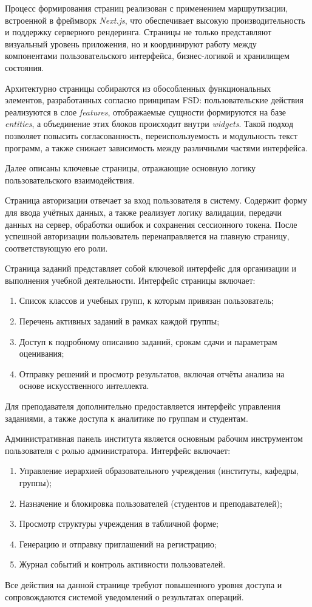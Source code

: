Процесс формирования страниц реализован с применением маршрутизации, встроенной в фреймворк \textit{Next.js}, что обеспечивает высокую производительность и поддержку серверного рендеринга. Страницы не только представляют визуальный уровень приложения, но и координируют работу между компонентами пользовательского интерфейса, бизнес-логикой и хранилищем состояния.

Архитектурно страницы собираются из обособленных функциональных элементов, разработанных согласно принципам FSD: пользовательские действия реализуются в слое \textit{features}, отображаемые сущности формируются на базе \textit{entities}, а объединение этих блоков происходит внутри \textit{widgets}. Такой подход позволяет повысить согласованность, переиспользуемость и модульность текст программ, а также снижает зависимость между различными частями интерфейса.

Далее описаны ключевые страницы, отражающие основную логику пользовательского взаимодействия.

Страница авторизации отвечает за вход пользователя в систему. Содержит форму для ввода учётных данных, а также реализует логику валидации, передачи данных на сервер, обработки ошибок и сохранения сессионного токена. После успешной авторизации пользователь перенаправляется на главную страницу, соответствующую его роли.

Страница заданий представляет собой ключевой интерфейс для организации и выполнения учебной деятельности. Интерфейс страницы включает:
\begin{enumerate}
\item Список классов и учебных групп, к которым привязан пользователь;
\item Перечень активных заданий в рамках каждой группы;
\item Доступ к подробному описанию заданий, срокам сдачи и параметрам оценивания;
\item Отправку решений и просмотр результатов, включая отчёты анализа на основе искусственного интеллекта.
\end{enumerate}
Для преподавателя дополнительно предоставляется интерфейс управления заданиями, а также доступа к аналитике по группам и студентам.

Административная панель института является основным рабочим инструментом пользователя с ролью администратора. Интерфейс включает:
\begin{enumerate}
\item Управление иерархией образовательного учреждения (институты, кафедры, группы);
\item Назначение и блокировка пользователей (студентов и преподавателей);
\item Просмотр структуры учреждения в табличной форме;
\item Генерацию и отправку приглашений на регистрацию;
\item Журнал событий и контроль активности пользователей.
\end{enumerate}
Все действия на данной странице требуют повышенного уровня доступа и сопровождаются системой уведомлений о результатах операций.


